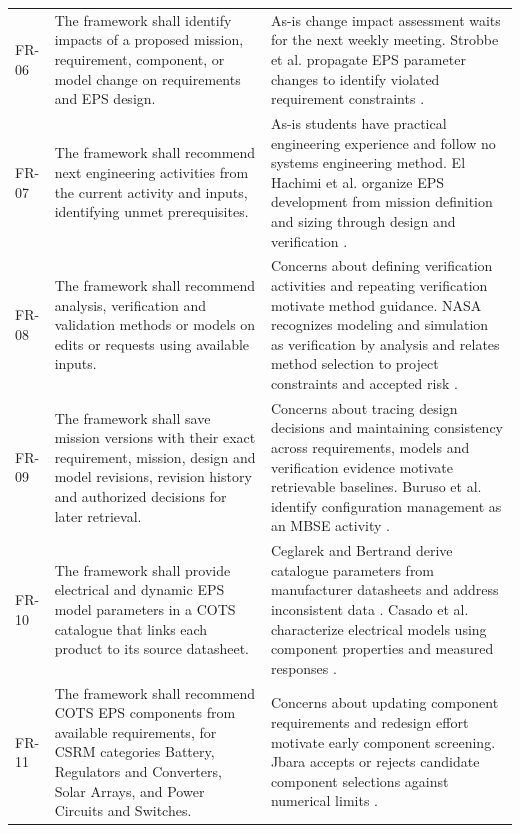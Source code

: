 \begin{longtable}{@{}P{0.13\ReportTableBodyWidth}P{0.45\ReportTableBodyWidth}P{0.42\ReportTableBodyWidth}@{}}
\addlinespace[3pt]
FR-06 & The framework shall identify impacts of a proposed mission, requirement, component, or model change on requirements and EPS design. & As-is change impact assessment waits for the next weekly meeting. Strobbe et al. propagate EPS parameter changes to identify violated requirement constraints \citep[Secs.~III--IV]{review-0764}. \\
\addlinespace[3pt]
FR-07 & The framework shall recommend next engineering activities from the current activity and inputs, identifying unmet prerequisites. & As-is students have practical engineering experience and follow no systems engineering method. El Hachimi et al. organize EPS development from mission definition and sizing through design and verification \citep[Secs.~2--5]{handpicked-0003}. \\
\addlinespace[3pt]
FR-08 & The framework shall recommend analysis, verification and validation methods or models on edits or requests using available inputs. & Concerns about defining verification activities and repeating verification motivate method guidance. NASA recognizes modeling and simulation as verification by analysis and relates method selection to project constraints and accepted risk \citep[Sec.~5.3.1.2]{nasa2016systems}. \\
\addlinespace[3pt]
FR-09 & The framework shall save mission versions with their exact requirement, mission, design and model revisions, revision history and authorized decisions for later retrieval. & Concerns about tracing design decisions and maintaining consistency across requirements, models and verification evidence motivate retrievable baselines. Buruso et al. identify configuration management as an MBSE activity \citep{buruso2026modelbased}. \\
\addlinespace[3pt]
FR-10 & The framework shall provide electrical and dynamic EPS model parameters in a COTS catalogue that links each product to its source datasheet. & Ceglarek and Bertrand derive catalogue parameters from manufacturer datasheets and address inconsistent data \citep[Sec.~3]{review-0257}. Casado et al. characterize electrical models using component properties and measured responses \citep[Sec.~2]{review-0573}. \\
\addlinespace[3pt]
FR-11 & The framework shall recommend COTS EPS components from available requirements, for CSRM categories Battery, Regulators and Converters, Solar Arrays, and Power Circuits and Switches. & Concerns about updating component requirements and redesign effort motivate early component screening. Jbara accepts or rejects candidate component selections against numerical limits \citep[Secs.~4--5]{review-0270}. \\

\end{longtable}
